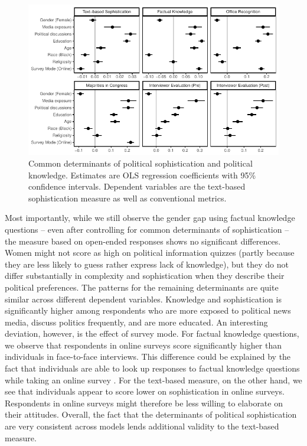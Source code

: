 \documentclass[12pt]{article}
\begin{document}
\begin{figure}[h]\centering
\includegraphics{../fig/determinants.pdf}
\caption{Common determinants of political sophistication and political knowledge. Estimates are OLS regression coefficients with 95\% confidence intervals. Dependent variables are the text-based sophistication measure as well as conventional metrics.}\label{fig:determinants}
\end{figure}

Most importantly, while we still observe the gender gap using factual knowledge questions -- even after controlling for common determinants of sophistication -- the measure based on open-ended responses shows no significant differences. Women might not score as high on political information quizzes (partly because they are less likely to guess rather express lack of knowledge), but they do not differ substantially in complexity and sophistication when they describe their political preferences. The patterns for the remaining determinants are quite similar across different dependent variables. Knowledge and sophistication is significantly higher among respondents who are more exposed to political news media, discuss politics frequently, and are more educated. An interesting deviation, however, is the effect of survey mode. For factual knowledge questions, we observe that respondents in online surveys score significantly higher than individuals in face-to-face interviews. This difference could be explained by the fact that individuals are able to look up responses to factual knowledge questions while taking an online survey \citep[see also][]{clifford2016cheating}. For the text-based measure, on the other hand, we see that individuals appear to score lower on sophistication in online surveys. Respondents in online surveys might therefore be less willing to elaborate on their attitudes. Overall, the fact that the determinants of political sophistication are very consistent across models lends additional validity to the text-based measure.
\end{document}
